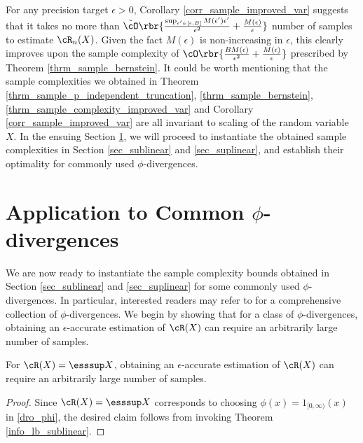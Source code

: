 \documentclass[9pt]{article} %
\numberwithin{equation}{section}
\renewcommand{\frac}[2]{\tfrac{#1}{#2}}
\begin{document}
For any precision target $\epsilon > 0$, Corollary \ref{corr_sample_improved_var} suggests that it takes no more than 
$
 \tilde{\cO} \rbr{ 
\frac{  \sup_{\epsilon' \in [\epsilon, B]}  M(\epsilon') \epsilon'  }{\epsilon^2}  + \frac{M(\epsilon)}{\epsilon}
}
$
number of samples to estimate $\cR_n(X)$.  
Given the fact $M(\epsilon)$ is non-increasing in $\epsilon$, 
this clearly improves upon the sample complexity of 
$
\cO \rbr{ 
\frac{ B M(\epsilon)  }{\epsilon^2} + \frac{M(\epsilon)}{\epsilon}
} 
$
prescribed by Theorem \ref{thrm_sample_bernstein}.
It could be worth mentioning that the sample complexities we obtained in Theorem \ref{thrm_sample_p_independent_truncation}, \ref{thrm_sample_bernstein}, \ref{thrm_sample_complexity_improved_var} and Corollary \ref{corr_sample_improved_var} are all invariant to scaling of the random variable $X$.
In the ensuing Section \ref{sec_application}, we will proceed to instantiate the obtained sample complexities in Section \ref{sec_sublinear} and \ref{sec_suplinear},   and establish their optimality for commonly used $\phi$-divergences. 







\newpage 

\section{Application to Common $\phi$-divergences}\label{sec_application}



We are now ready to instantiate the sample complexity bounds obtained in Section \ref{sec_sublinear} and \ref{sec_suplinear} for some commonly used $\phi$-divergences.
In particular, interested readers may refer to  \cite[Table 1]{bayraksan2015data} for a comprehensive collection of $\phi$-divergences.
We begin by showing that for a class of $\phi$-divergences, obtaining an $\epsilon$-accurate estimation of $\cR(X)$ can require an arbitrarily large number of samples. 

\begin{corollary}
For $\cR(X) = \esssup X$, obtaining an $\epsilon$-accurate estimation of $\cR(X)$ can require an arbitrarily large number of samples.
\end{corollary}

\begin{proof}
Since $\cR(X) = \esssup X$ corresponds to choosing $\phi(x) = \mathrm{1}_{[0, \infty)}(x)$ in \eqref{dro_phi},
the desired claim follows from invoking Theorem \ref{info_lb_sublinear}.
\end{proof}
\end{document}
